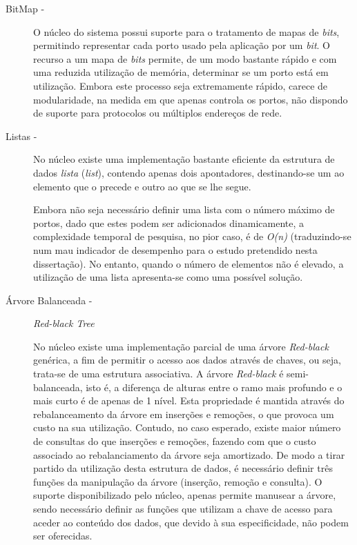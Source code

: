 \begin{description}

\item[BitMap - ]

O núcleo do sistema possui suporte para o tratamento de mapas de \textit{bits}, permitindo representar cada porto usado pela aplicação por um \textit{bit}.
O recurso a um mapa de \textit{bits} permite, de um modo bastante rápido e com uma reduzida utilização de memória, determinar se um porto está em utilização.
Embora este processo seja extremamente rápido, carece de modularidade, na medida em que apenas controla os portos, não dispondo de suporte para protocolos ou múltiplos endereços de rede.

\item[Listas - ]

No núcleo existe uma implementação bastante eficiente da estrutura de dados \emph{lista} (\emph{list}), contendo apenas dois apontadores, destinando-se um ao elemento que o precede e outro ao que se lhe segue.

Embora não seja necessário definir uma lista com o número máximo de portos, dado que estes podem ser adicionados dinamicamente, a complexidade temporal de pesquisa, no pior caso, é de \textit{O(n)} (traduzindo-se num mau indicador de desempenho para o estudo pretendido nesta dissertação).
No entanto, quando o número de elementos não é elevado, a utilização de uma lista apresenta-se como uma possível solução.

\item[Árvore Balanceada - ] \textit{Red-black Tree} 

No núcleo existe uma implementação parcial de uma árvore \textit{Red-black} genérica, a fim de permitir o acesso aos dados através de chaves, ou seja, trata-se de uma estrutura associativa.
A árvore \textit{Red-black} é semi-balanceada, isto é, a diferença de alturas entre o ramo mais profundo e o mais curto é de apenas de 1 nível.
Esta propriedade é mantida através do rebalanceamento da árvore em inserções e remoções, o que provoca um custo na sua utilização.
Contudo, no caso esperado, existe maior número de consultas do que inserções e remoções, fazendo com que o custo associado ao rebalanciamento da árvore seja amortizado.
De modo a tirar partido da utilização desta estrutura de dados, é necessário definir três funções da manipulação da árvore (inserção, remoção e consulta).
O suporte disponibilizado pelo núcleo, apenas permite manusear a árvore, sendo necessário definir as funções que utilizam a chave de acesso para aceder ao conteúdo dos dados, que devido à sua especificidade, não podem ser oferecidas.


\end{description}
